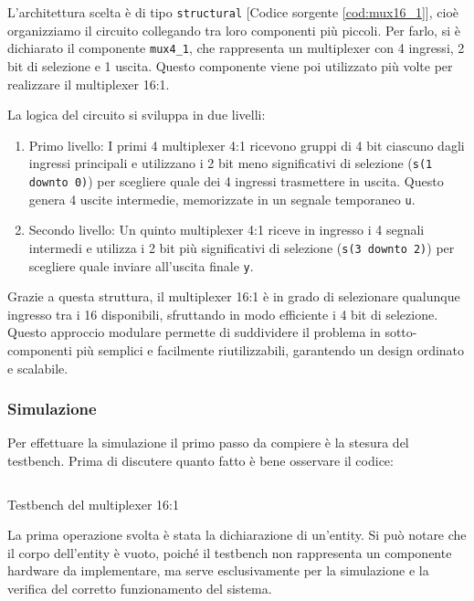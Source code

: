 L’architettura scelta è di tipo \texttt{structural} [Codice sorgente \ref{cod:mux16_1}], cioè organizziamo il circuito collegando tra loro componenti più piccoli. Per farlo, si è dichiarato il componente \texttt{mux4\_1}, che rappresenta un multiplexer con 4 ingressi, 2 bit di selezione e 1 uscita. Questo componente viene poi utilizzato più volte per realizzare il multiplexer 16:1.

La logica del circuito si sviluppa in due livelli:

\begin{enumerate}
    \item Primo livello: I primi 4 multiplexer 4:1 ricevono gruppi di 4 bit ciascuno dagli ingressi principali e utilizzano i 2 bit meno significativi di selezione (\texttt{s(1 downto 0)}) per scegliere quale dei 4 ingressi trasmettere in uscita. Questo genera 4 uscite intermedie, memorizzate in un segnale temporaneo \texttt{u}.
    \item Secondo livello: Un quinto multiplexer 4:1 riceve in ingresso i 4 segnali intermedi e utilizza i 2 bit più significativi di selezione (\texttt{s(3 downto 2)}) per scegliere quale inviare all’uscita finale \texttt{y}.
\end{enumerate}

Grazie a questa struttura, il multiplexer 16:1 è in grado di selezionare qualunque ingresso tra i 16 disponibili, sfruttando in modo efficiente i 4 bit di selezione. Questo approccio modulare permette di suddividere il problema in sotto-componenti più semplici e facilmente riutilizzabili, garantendo un design ordinato e scalabile.

\subsubsection{Simulazione}
Per effettuare la simulazione il primo passo da compiere è la stesura del testbench. Prima di discutere quanto fatto è bene osservare il codice:

\begin{code}
    \inputminted{vhdl}{vhdl/mux16_1_tb.vhd}
    \caption{Testbench del multiplexer 16:1}
    \label{cod:mux16_1_tb}
\end{code}

La prima operazione svolta è stata la dichiarazione di un’entity. Si può notare che il corpo dell’entity è vuoto, poiché il testbench non rappresenta un componente hardware da implementare, ma serve esclusivamente per la simulazione e la verifica del corretto funzionamento del sistema.

